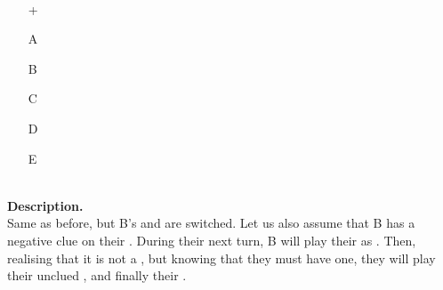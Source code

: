 \begin{example}	\hfill \\
	\begin{minipage}{0.45\textwidth}
		\begin{itemize}
			\item[\Large +]      
			\item[\Large A]    
			\item[\Large B]    
			\item[\Large C]    
			\item[\Large D]    
			\item[\Large E]    
		\end{itemize}
	\end{minipage}%
	\begin{minipage}{0.55\textwidth}
		\hfill \\
		
		\textbf{Description.} \\
		
		Same as before, but B's  and  are switched. Let us also assume that B has a negative  clue on their . During their next turn, B will play their  as . Then, realising that it is not a , but knowing that they must have one, they will play their unclued , and finally their .
	\end{minipage}
\end{example} \vspace{0.15 cm}